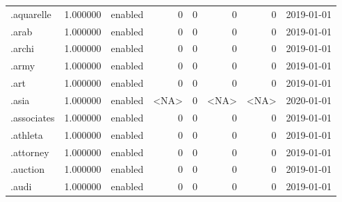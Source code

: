 \begin{tabular}{lrlrrrrl}
.aquarelle                &          1.000000 &         enabled &                           0 &                           0 &                           0 &                   0 &           2019-01-01 \\
.arab                     &          1.000000 &         enabled &                           0 &                           0 &                           0 &                   0 &           2019-01-01 \\
.archi                    &          1.000000 &         enabled &                           0 &                           0 &                           0 &                   0 &           2019-01-01 \\
.army                     &          1.000000 &         enabled &                           0 &                           0 &                           0 &                   0 &           2019-01-01 \\
.art                      &          1.000000 &         enabled &                           0 &                           0 &                           0 &                   0 &           2019-01-01 \\
.asia                     &          1.000000 &         enabled &                        <NA> &                           0 &                        <NA> &                <NA> &           2020-01-01 \\
.associates               &          1.000000 &         enabled &                           0 &                           0 &                           0 &                   0 &           2019-01-01 \\
.athleta                  &          1.000000 &         enabled &                           0 &                           0 &                           0 &                   0 &           2019-01-01 \\
.attorney                 &          1.000000 &         enabled &                           0 &                           0 &                           0 &                   0 &           2019-01-01 \\
.auction                  &          1.000000 &         enabled &                           0 &                           0 &                           0 &                   0 &           2019-01-01 \\
.audi                     &          1.000000 &         enabled &                           0 &                           0 &                           0 &                   0 &           2019-01-01 \\

\end{tabular}
